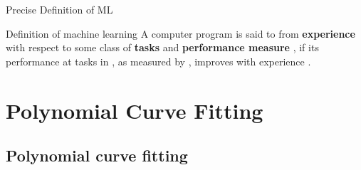 \documentclass{bredelebeamer}
\begin{document}
\begin{frame}{Precise Definition of ML}
  \begin{block}{Definition of machine learning}
    A computer program is said to 
    from \textbf{experience} 
    with respect to some class of \textbf{tasks} 
    and \textbf{performance measure} ,
    if its performance at tasks in ,
    as measured by ,
    improves with experience .
  \end{block}
\end{frame}

\section{Polynomial Curve Fitting}
\subsection{Polynomial curve fitting}
\end{document}
